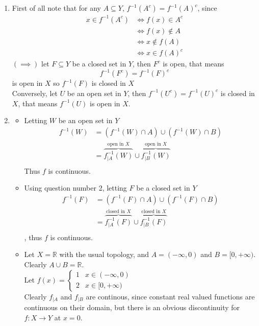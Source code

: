 \documentclass[12pt]{article}
\begin{document}
\begin{enumerate}
\begin{itemize}
		\end{itemize}
	\item First of all note that for any $A \subseteq Y$, $f^{-1}(A^c) = f^{-1}(A)^c$, since 
		\begin{align*}
			x \in f^{-1}(A^c) &\iff f(x) \in A^c \\
					  &\iff f(x) \notin A \\
					  &\iff x \notin f(A) \\
					  &\iff x \in f(A)^c
		\end{align*}
	 $(\implies)$ let $F \subseteq Y$ be a closed set in $Y$, then $F^c$ is open, that means 
		$$
			f^{-1}(F^c) = f^{-1}(F)^c 
		$$
		is open in $X$ so $f^{-1}(F)$ is closed in $X$\\
		Conversely, let $U$ be an open set in $Y$, then $f^{-1}(U^c) = f^{-1}(U)^c$ is closed in $X$, that means $f^{-1}(U)$ is open in $X$. 
	\item \begin{itemize}
			\item[(a)] Letting $W$ be an open set in $Y$
		\begin{align*}
			f^{-1}(W) &= (f^{-1}(W) \cap A) \cup (f^{-1}(W) \cap B)\\
				  &= \overbrace{f_{| A}^{-1}(W)}^{\text{open in $X$}} \cup \overbrace{f_{| B}^{-1}(W)}^{\text{open in $X$}} \\
		\end{align*}
		Thus $f$ is continuous.
	\item[(b)]
		Using question number 2, letting $F$ be a closed set in $Y$
		\begin{align*}
			f^{-1}(F) &= (f^{-1}(F) \cap A) \cup (f^{-1}(F) \cap B)\\
				  &= \overbrace{f_{| A}^{-1}(F)}^{\text{closed  in $X$}} \cup \overbrace{f_{| B}^{-1}(F)}^{\text{closed in $X$}} \\
		\end{align*}, thus $f$ is continuous.
	\item Let $X = \mathbb{R}$ with the usual topology, and $A = (-\infty, 0)$ and $B = [0,+\infty)$. Clearly $A \cup B = \mathbb{R}$.  \\Let $f(x) = \begin{cases}
			1 & x \in (-\infty, 0)\\
			2 & x \in [0,+\infty)
		\end{cases}$\\
		Clearly $f_{|A}$ and $f_{|B}$ are continous, since constant real valued functions are continuous on their domain, but there is an obvious discontinuity for $f \colon X \to Y$ at $x=0$.
	

\end{itemize}
\end{enumerate}
\end{document}
